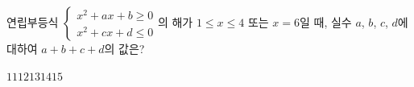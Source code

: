 \hspace*{2mm}\begin{minipage}[t]{\dimexpr\linewidth-2mm\relax}\vspace{0pt}
연립부등식 $\begin{cases} x^2+ax+b\ge 0 \\ x^2+cx+d\le 0 \end{cases}$의 해가 $1\le x\le 4$ 또는 $x=6$일 때, 실수 $a$, $b$, $c$, $d$에 대하여 $a+b+c+d$의 값은?
\begin{choices32}{$11$}{$12$}{$13$}{$14$}{$15$}\end{choices32}\end{minipage}
